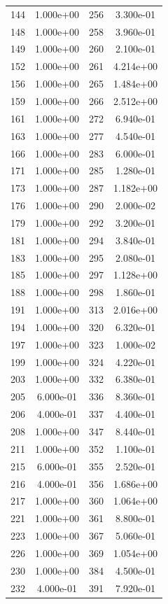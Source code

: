 \documentclass[12pt]{article}
\begin{document}
\begin{longtable}{@{}cccc@{}}
144 & 1.000e+00 & 256 & 3.300e-01 \\
148 & 1.000e+00 & 258 & 3.960e-01 \\
149 & 1.000e+00 & 260 & 2.100e-01 \\
152 & 1.000e+00 & 261 & 4.214e+00 \\
156 & 1.000e+00 & 265 & 1.484e+00 \\
159 & 1.000e+00 & 266 & 2.512e+00 \\
161 & 1.000e+00 & 272 & 6.940e-01 \\
163 & 1.000e+00 & 277 & 4.540e-01 \\
166 & 1.000e+00 & 283 & 6.000e-01 \\
171 & 1.000e+00 & 285 & 1.280e-01 \\
173 & 1.000e+00 & 287 & 1.182e+00 \\
176 & 1.000e+00 & 290 & 2.000e-02 \\
179 & 1.000e+00 & 292 & 3.200e-01 \\
181 & 1.000e+00 & 294 & 3.840e-01 \\
183 & 1.000e+00 & 295 & 2.080e-01 \\
185 & 1.000e+00 & 297 & 1.128e+00 \\
188 & 1.000e+00 & 298 & 1.860e-01 \\
191 & 1.000e+00 & 313 & 2.016e+00 \\
194 & 1.000e+00 & 320 & 6.320e-01 \\
197 & 1.000e+00 & 323 & 1.000e-02 \\
199 & 1.000e+00 & 324 & 4.220e-01 \\
203 & 1.000e+00 & 332 & 6.380e-01 \\
205 & 6.000e-01 & 336 & 8.360e-01 \\
206 & 4.000e-01 & 337 & 4.400e-01 \\
208 & 1.000e+00 & 347 & 8.440e-01 \\
211 & 1.000e+00 & 352 & 1.100e-01 \\
215 & 6.000e-01 & 355 & 2.520e-01 \\
216 & 4.000e-01 & 356 & 1.686e+00 \\
217 & 1.000e+00 & 360 & 1.064e+00 \\
221 & 1.000e+00 & 361 & 8.800e-01 \\
223 & 1.000e+00 & 367 & 5.060e-01 \\
226 & 1.000e+00 & 369 & 1.054e+00 \\
230 & 1.000e+00 & 384 & 4.500e-01 \\
232 & 4.000e-01 & 391 & 7.920e-01 \\

\end{longtable}
\end{document}
